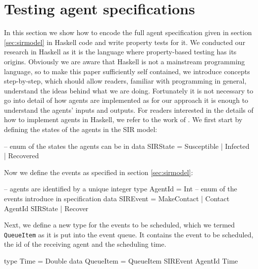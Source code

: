 \section{Testing agent specifications}
\label{sec:method}

In this section we show how to encode the full agent specification given in section \ref{sec:sirmodel} in Haskell code and write property tests for it. We conducted our research in Haskell as it is the language where property-based testing has its origins. Obviously we are aware that Haskell is not a mainstream programming language, so to make this paper sufficiently self contained, we introduce concepts step-by-step, which should allow readers, familiar with programming in general, understand the ideas behind what we are doing. Fortunately it is not necessary to go into detail of how agents are implemented as for our approach it is enough to understand the agents' inputs and outputs. For readers interested in the details of how to implement agents in Haskell, we refer to the work of \cite{thaler_pure_2018}. We first start by defining the states of the agents in the SIR model:

\begin{HaskellCode}
-- enum of the states the agents can be in
data SIRState = Susceptible | Infected | Recovered
\end{HaskellCode}

Now we define the events as specified in section \ref{sec:sirmodel}:

\begin{HaskellCode}
-- agents are identified by a unique integer
type AgentId = Int
-- enum of the events introduce in specification
data SIREvent 
  = MakeContact
  | Contact AgentId SIRState
  | Recover 
\end{HaskellCode}

Next, we define a new type for the events to be scheduled, which we termed \texttt{QueueItem} as it is put into the event queue. It contains the event to be scheduled, the id of the receiving agent and the scheduling time.

\begin{HaskellCode}
type Time      = Double
data QueueItem = QueueItem SIREvent AgentId Time
\end{HaskellCode}

